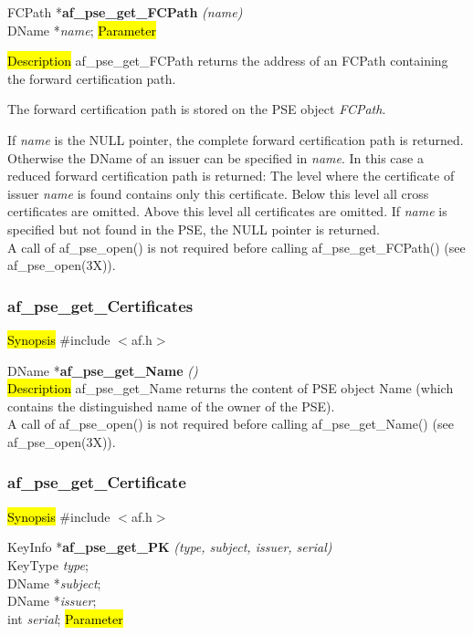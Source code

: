 FCPath *{\bf af\_pse\_get\_FCPath} {\em (name)} \\
DName *{\em name};
\hl{Parameter}

\hl{Description}
af\_pse\_get\_FCPath returns the address of an FCPath containing the forward certification path.

The forward certification path is stored on the PSE object
{\em FCPath}.

If {\em name} is the NULL pointer, the complete forward certification path is returned. Otherwise
the DName of an issuer can be specified in {\em name}. In this case a reduced forward 
certification path is returned:
\be
\m The level where the certificate of issuer {\em name} is found contains only this certificate.
\m Below this level all cross certificates are omitted.
\m Above this level all certificates are omitted.
\ee
If {\em name} is specified but not found in the PSE, the NULL pointer is returned.
\\ [1em]
A call of af\_pse\_open() is not required before calling af\_pse\_get\_FCPath()
(see af\_pse\_open(3X)).

\subsubsection{af\_pse\_get\_Certificates}
\label{af_get_Name}
\hl{Synopsis}
\#include $<$af.h$>$

DName *{\bf af\_pse\_get\_Name} {\em ()} \\
\hl{Description}
af\_pse\_get\_Name returns the content of PSE object Name (which
contains the distinguished name of the owner of the PSE).
\\ [1em]
A call of af\_pse\_open() is not required before calling af\_pse\_get\_Name()
(see af\_pse\_open(3X)).

\subsubsection{af\_pse\_get\_Certificate}
\label{af_search_Name}
\hl{Synopsis}
\#include $<$af.h$>$

KeyInfo *{\bf af\_pse\_get\_PK} {\em (type, subject, issuer, serial)} \\
KeyType {\em type}; \\
DName *{\em subject}; \\
DName *{\em issuer}; \\
int {\em serial};
\hl{Parameter}

